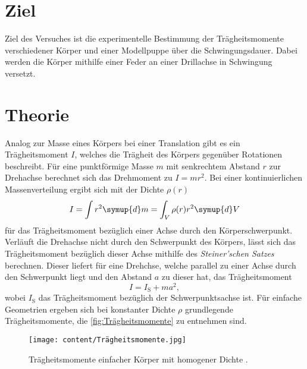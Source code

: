 \section{Ziel}
\label{sec:Ziel}
Ziel des Versuches ist die experimentelle Bestimmung der Trägheitsmomente verschiedener Körper und einer Modellpuppe über die Schwingungsdauer. Dabei werden die Körper 
mithilfe einer Feder an einer Drillachse in Schwingung versetzt.

\section{Theorie}
\label{sec:Theorie}
Analog zur Masse eines Körpers bei einer Translation gibt es ein Trägheitsmoment $I$, welches die Trägheit des Körpers gegenüber Rotationen beschreibt. Für eine punktförmige
Masse $m$ mit senkrechtem Abstand $r$ zur Drehachse berechnet sich das Drehmoment zu $I = mr^2$. Bei einer kontinuierlichen Massenverteilung ergibt sich mit der 
Dichte $\rho(r)$
\begin{equation}
    \label{eqn:Trägheitsmoment}
    I = \int r^2 \symup{d}m = \int_V \rho(r) r^2 \symup{d}V
\end{equation}
für das Trägheitsmoment bezüglich einer Achse durch den Körperschwerpunkt. Verläuft die Drehachse nicht durch den Schwerpunkt des Körpers, lässt sich das Trägheitsmoment 
bezüglich dieser Achse mithilfe des \textit{Steiner'schen Satzes} berechnen. Dieser liefert für eine Drehchse, welche parallel zu einer Achse durch den Schwerpunkt liegt und den Abstand
$a$ zu dieser hat, das Trägheitsmoment 
\begin{equation}
    \label{eqn:Steiner}
    I = I_\text{S} + ma^2,
\end{equation}    
wobei $I_\text{S}$ das Trägheitsmoment bezüglich der Schwerpunktsachse ist.
Für einfache Geometrien ergeben sich bei konstanter Dichte $\rho$ grundlegende Trägheitsmomente, die \autoref{fig:Trägheitsmomente} zu entnehmen sind.
\begin{figure}
    \centering
    \caption{Trägheitsmomente einfacher Körper mit homogener Dichte \cite{v101}.}
    \label{fig:Trägheitsmomente}
    \texttt{[image: content/Trägheitsmomente.jpg]}
\end{figure}

